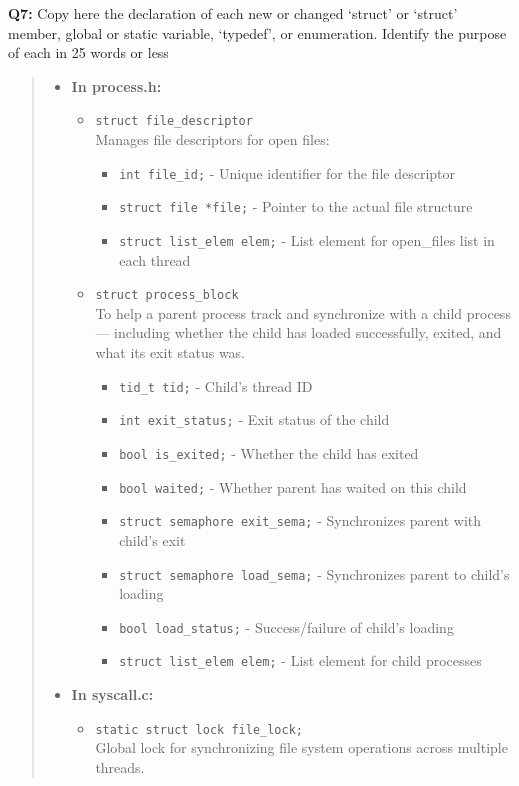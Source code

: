 \documentclass[a4paper,11pt]{paper}
\begin{document}
\textbf{Q7:} Copy here the declaration of each new or changed `struct' or `struct' member, global or static variable, `typedef', or enumeration.  Identify the purpose of each in 25 words or less
\begin{quote}
  \begin{itemize}
\item \textbf{In process.h:}
  \begin{itemize}
  \item \texttt{struct file\_descriptor} \\
   Manages file descriptors for open files:
   \begin{itemize}
   \item \texttt{int file\_id;} - Unique identifier for the file descriptor
   \item \texttt{struct file *file;} - Pointer to the actual file structure
   \item \texttt{struct list\_elem elem;} - List element for open\_files list in each thread
   \end{itemize}

  \item \texttt{struct process\_block} \\
   To help a parent process track and synchronize with a child process — including whether the child has loaded successfully, exited, and what its exit  status was.
   \begin{itemize}
   \item \texttt{tid\_t tid;} - Child's thread ID
   \item \texttt{int exit\_status;} - Exit status of the child
   \item \texttt{bool is\_exited;} - Whether the child has exited
   \item \texttt{bool waited;} - Whether parent has waited on this child
   \item \texttt{struct semaphore exit\_sema;} - Synchronizes parent with child's exit
   \item \texttt{struct semaphore load\_sema;} - Synchronizes parent to child's loading
   \item \texttt{bool load\_status;} - Success/failure of child's loading
   \item \texttt{struct list\_elem elem;} - List element for child processes
   \end{itemize}
  \end{itemize}
  
\item \textbf{In syscall.c:}
  \begin{itemize}
  \item \texttt{static struct lock file\_lock;} \\
       Global lock for synchronizing file system operations across multiple threads.
  \end{itemize}
    

\end{itemize}
\end{quote}
\end{document}
